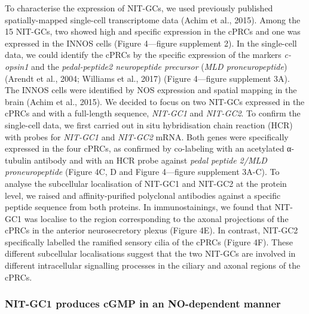 \documentclass[
  11pt,
  letterpaper,
  DIV=11,
  numbers=noendperiod]{scrartcl}
\begin{document}
To characterise the expression of NIT-GCs, we used previously published
spatially-mapped single-cell transcriptome data (Achim et al., 2015).
Among the 15 NIT-GCs, two showed high and specific expression in the
cPRCs and one was expressed in the INNOS cells (Figure 4---figure
supplement 2). In the single-cell data, we could identify the cPRCs by
the specific expression of the markers \emph{c-opsin1} and the
\emph{pedal-peptide2 neuropeptide precursor} (\emph{MLD
proneuropeptide}) (Arendt et al., 2004; Williams et al., 2017) (Figure
4---figure supplement 3A). The INNOS cells were identified by NOS
expression and spatial mapping in the brain (Achim et al., 2015). We
decided to focus on two NIT-GCs expressed in the cPRCs and with a
full-length sequence, \emph{NIT-GC1} and \emph{NIT-GC2}. To confirm the
single-cell data, we first carried out in situ hybridisation chain
reaction (HCR) with probes for \emph{NIT-GC1} and \emph{NIT-GC2} mRNA.
Both genes were specifically expressed in the four cPRCs, as confirmed
by co-labeling with an acetylated α-tubulin antibody and with an HCR
probe against \emph{pedal peptide 2/MLD proneuropeptide} (Figure 4C, D
and Figure 4---figure supplement 3A-C). To analyse the subcellular
localisation of NIT-GC1 and NIT-GC2 at the protein level, we raised and
affinity-purified polyclonal antibodies against a specific peptide
sequence from both proteins. In immunostainings, we found that NIT-GC1
was localise to the region corresponding to the axonal projections of
the cPRCs in the anterior neurosecretory plexus (Figure 4E). In
contrast, NIT-GC2 specifically labelled the ramified sensory cilia of
the cPRCs (Figure 4F). These different subcellular localisations suggest
that the two NIT-GCs are involved in different intracellular signalling
processes in the ciliary and axonal regions of the cPRCs.

\subsubsection{NIT-GC1 produces cGMP in an NO-dependent
manner}\label{nit-gc1-produces-cgmp-in-an-no-dependent-manner}
\end{document}
